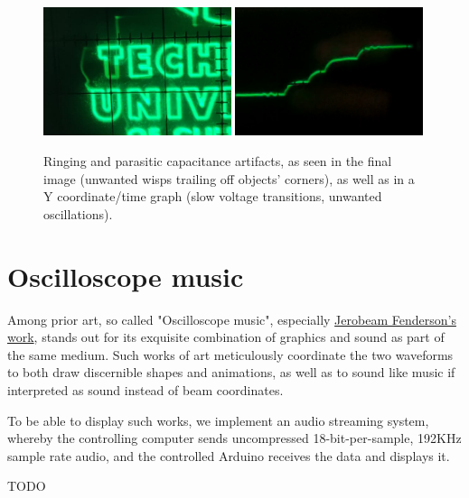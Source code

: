 \documentclass[12pt]{article}
\begin{document}
\begin{figure}[p]
\centering
\includegraphics[width=0.49\textwidth]{images/ringing-2d.png}\hspace{0.01\textwidth}
\includegraphics[width=0.49\textwidth]{images/ringing-1d.png}
\caption{Ringing and parasitic capacitance artifacts, as seen in the final image (unwanted wisps trailing off objects' corners), as well as in a Y coordinate/time graph (slow voltage transitions, unwanted oscillations).}
\label{fig:ringing}
\end{figure}

\section{Oscilloscope music}

Among prior art, so called "Oscilloscope music", especially \href{https://www.youtube.com/playlist?list=PLFgoUhNvMLrr8izq38HX6rjFR-nkfklxw}{Jerobeam Fenderson's work}, stands out for its exquisite combination of graphics and sound as part of the same medium. Such works of art meticulously coordinate the two waveforms to both draw discernible shapes and animations, as well as to sound like music if interpreted as sound instead of beam coordinates.

To be able to display such works, we implement an audio streaming system, whereby the controlling computer sends uncompressed 18-bit-per-sample, 192KHz sample rate audio, and the controlled Arduino receives the data and displays it.

TODO
\end{document}
